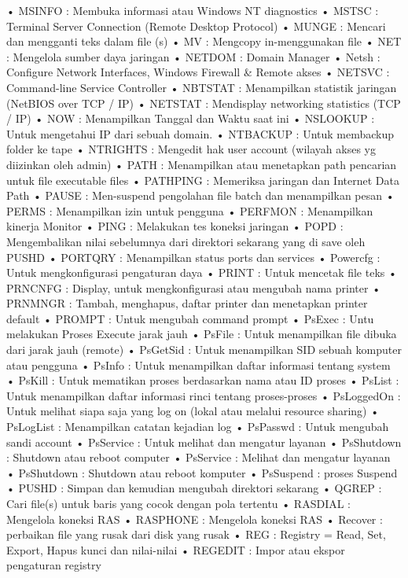 \documentclass{article}
\begin{document}
• MSINFO : Membuka informasi atau Windows NT diagnostics
• MSTSC : Terminal Server Connection (Remote Desktop Protocol)
• MUNGE : Mencari dan mengganti teks dalam file (s)
• MV : Mengcopy in-menggunakan file
• NET : Mengelola sumber daya jaringan
• NETDOM : Domain Manager
• Netsh : Configure Network Interfaces, Windows Firewall & Remote akses
• NETSVC : Command-line Service Controller
• NBTSTAT : Menampilkan statistik jaringan (NetBIOS over TCP / IP)
• NETSTAT : Mendisplay networking statistics (TCP / IP)
• NOW : Menampilkan  Tanggal dan Waktu saat ini
• NSLOOKUP : Untuk mengetahui IP dari sebuah domain.
• NTBACKUP : Untuk membackup  folder ke tape
• NTRIGHTS : Mengedit hak user account (wilayah akses yg diizinkan oleh admin)
• PATH : Menampilkan atau menetapkan path pencarian untuk file executable files
• PATHPING : Memeriksa jaringan dan Internet Data Path
• PAUSE : Men-suspend pengolahan file batch dan menampilkan pesan
• PERMS : Menampilkan izin untuk pengguna
• PERFMON : Menampilkan kinerja Monitor
• PING : Melakukan tes koneksi jaringan
• POPD : Mengembalikan nilai sebelumnya dari direktori sekarang yang di save oleh PUSHD
• PORTQRY : Menampilkan status ports dan services
• Powercfg : Untuk mengkonfigurasi pengaturan daya
• PRINT : Untuk mencetak file teks
• PRNCNFG : Display, untuk mengkonfigurasi atau mengubah nama printer
• PRNMNGR : Tambah, menghapus, daftar printer dan menetapkan printer default
• PROMPT : Untuk mengubah command prompt
• PsExec : Untu melakukan Proses Execute jarak jauh
• PsFile : Untuk menampilkan file dibuka dari jarak jauh (remote)
• PsGetSid : Untuk menampilkan SID sebuah komputer atau pengguna
• PsInfo : Untuk menampilkan daftar informasi tentang system
• PsKill : Untuk mematikan proses berdasarkan nama atau ID proses
• PsList : Untuk menampilkan daftar informasi rinci tentang proses-proses
• PsLoggedOn : Untuk melihat siapa saja yang log on (lokal atau melalui resource sharing)
• PsLogList : Menampilkan catatan kejadian log
• PsPasswd : Untuk mengubah sandi account
• PsService : Untuk melihat dan mengatur layanan
• PsShutdown : Shutdown atau reboot computer
• PsService : Melihat dan mengatur layanan
• PsShutdown : Shutdown atau reboot komputer
• PsSuspend : proses Suspend
• PUSHD : Simpan dan kemudian mengubah direktori sekarang
• QGREP : Cari file(s) untuk baris yang cocok dengan pola tertentu
• RASDIAL : Mengelola koneksi RAS
• RASPHONE : Mengelola koneksi RAS
• Recover : perbaikan file yang rusak dari disk yang rusak
• REG : Registry = Read, Set, Export, Hapus kunci dan nilai-nilai
• REGEDIT : Impor atau ekspor  pengaturan registry
\end{document}
